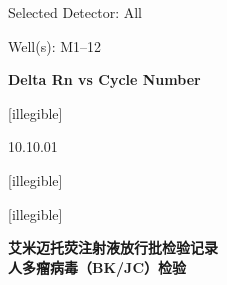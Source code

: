 \documentclass[UTF8,10pt,a4paper,fontset=fandol]{ctexart}
\newcommand{\fieldvalue}[1]{#1}
\newcommand{\handwritten}[1]{#1}
\begin{document}

\newpage

Selected Detector: \fieldvalue{All}

Well(s): \fieldvalue{M1--12}

\begin{center}
\textbf{Delta Rn vs Cycle Number}

\end{center}


\begin{flushright}
\fieldvalue{\handwritten{[illegible]}}

\fieldvalue{\handwritten{10.10.01}}

\fieldvalue{\handwritten{[illegible]}}

\fieldvalue{\handwritten{[illegible]}}
\end{flushright}


\newpage

\begin{center}
{\Large \textbf{艾米迈托荧注射液放行批检验记录}}\\[2pt]
\textbf{人多瘤病毒（BK/JC）检验}
\end{center}
\end{document}
